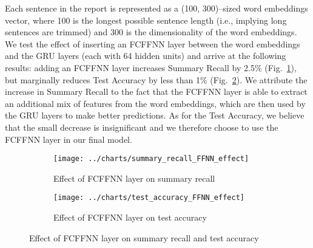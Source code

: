 Each sentence in the report is represented as a (100, 300)--sized word embeddings vector, where 100 is the longest possible sentence length (i.e., implying long sentences are trimmed) and 300 is the dimensionality of the word embeddings.
We test the effect of inserting an FCFFNN layer between the word embeddings and the GRU layers (each with 64 hidden units) and arrive at the following results:
adding an FCFFNN layer increases Summary Recall by 2.5\% (Fig.~\ref{fig:summary_recall_FFNN_effect}), but marginally reduces Test Accuracy by less than 1\% (Fig.~\ref{fig:test_accuracy_FFNN_effect}).
We attribute the increase in Summary Recall to the fact that the FCFFNN layer is able to extract an additional mix of features from the word embeddings, which are then used by the GRU layers to make better predictions.
As for the Test Accuracy, we believe that the small decrease is insignificant and we therefore choose to use the FCFFNN layer in our final model.

\begin{figure}[ht]
    \begin{subfigure}{0.49\textwidth}
        \centering \texttt{[image: ../charts/summary\_recall\_FFNN\_effect]}
        \caption{Effect of FCFFNN layer on summary recall}
        \label{fig:summary_recall_FFNN_effect}
    \end{subfigure}%
    \hfill
    \begin{subfigure}{0.49\textwidth}
        \centering
        \texttt{[image: ../charts/test\_accuracy\_FFNN\_effect]}
        \caption{Effect of FCFFNN layer on test accuracy}
        \label{fig:test_accuracy_FFNN_effect}
    \end{subfigure}
    \caption{Effect of FCFFNN layer on summary recall and test accuracy}
    \label{fig:FCFFNN}
\end{figure}

